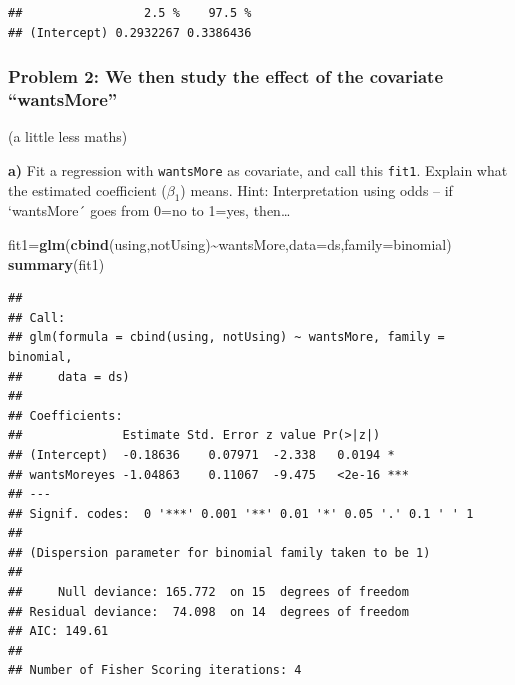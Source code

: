 \documentclass[
]{article}
\newenvironment{Shaded}{\begin{snugshade}}{\end{snugshade}}
\newcommand{\AttributeTok}[1]{\textcolor[rgb]{0.13,0.29,0.53}{#1}}
\newcommand{\FunctionTok}[1]{\textcolor[rgb]{0.13,0.29,0.53}{\textbf{#1}}}
\newcommand{\NormalTok}[1]{#1}
\newcommand{\OtherTok}[1]{\textcolor[rgb]{0.56,0.35,0.01}{#1}}
\newcommand{\SpecialCharTok}[1]{\textcolor[rgb]{0.81,0.36,0.00}{\textbf{#1}}}
\begin{document}
\begin{verbatim}
##                 2.5 %    97.5 %
## (Intercept) 0.2932267 0.3386436
\end{verbatim}

\hypertarget{problem-2-we-then-study-the-effect-of-the-covariate-wantsmore}{%
\subsubsection{Problem 2: We then study the effect of the covariate
``wantsMore''}\label{problem-2-we-then-study-the-effect-of-the-covariate-wantsmore}}

(a little less maths)

\textbf{a)} Fit a regression with \texttt{wantsMore} as covariate, and
call this \texttt{fit1}. Explain what the estimated coefficient
(\(\beta_1\)) means. Hint: Interpretation using odds -- if `wantsMore´
goes from 0=no to 1=yes, then\ldots{}

\begin{Shaded}
\begin{Highlighting}[]
\NormalTok{fit1}\OtherTok{=}\FunctionTok{glm}\NormalTok{(}\FunctionTok{cbind}\NormalTok{(using,notUsing)}\SpecialCharTok{\textasciitilde{}}\NormalTok{wantsMore,}\AttributeTok{data=}\NormalTok{ds,}\AttributeTok{family=}\NormalTok{binomial)}
\FunctionTok{summary}\NormalTok{(fit1)}
\end{Highlighting}
\end{Shaded}

\begin{verbatim}
## 
## Call:
## glm(formula = cbind(using, notUsing) ~ wantsMore, family = binomial, 
##     data = ds)
## 
## Coefficients:
##              Estimate Std. Error z value Pr(>|z|)    
## (Intercept)  -0.18636    0.07971  -2.338   0.0194 *  
## wantsMoreyes -1.04863    0.11067  -9.475   <2e-16 ***
## ---
## Signif. codes:  0 '***' 0.001 '**' 0.01 '*' 0.05 '.' 0.1 ' ' 1
## 
## (Dispersion parameter for binomial family taken to be 1)
## 
##     Null deviance: 165.772  on 15  degrees of freedom
## Residual deviance:  74.098  on 14  degrees of freedom
## AIC: 149.61
## 
## Number of Fisher Scoring iterations: 4
\end{verbatim}

\begin{Shaded}
\end{Shaded}
\end{document}
